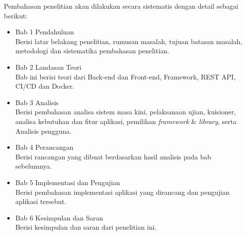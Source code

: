 Pembahasan penelitian akan dilakukan secara sistematis dengan detail sebagai berikut:

\begin{itemize}
    \item Bab 1 Pendahuluan \\
        Berisi latar belakang penelitian, rumusan masalah, tujuan batasan masalah, metodologi dan sistematika pembahasan penelitian.
    
    \item Bab 2 Landasan Teori \\
        Bab ini berisi teori dari Back-end dan Front-end, Framework, REST API, CI/CD dan Docker.
        
    \item Bab 3 Analisis \\
        Berisi pembahasan analisa sistem masa kini, pelaksanaan ujian, kuisioner, analisa kebutuhan dan fitur aplikasi, pemilihan \textit{framework} & \textit{library}, serta Analisis pengguna.
        
        
    \item Bab 4 Perancangan \\
        Berisi rancangan yang dibuat berdasarkan hasil analisis pada bab sebelumnya.
    
    \item Bab 5 Implementasi dan Pengujian \\
        Berisi pembahasan implementasi aplikasi yang dirancang dan pengujian aplikasi tersebut.
        
    \item Bab 6 Kesimpulan dan Saran \\
        Berisi kesimpulan dan saran dari penelitian ini.
\end{itemize}